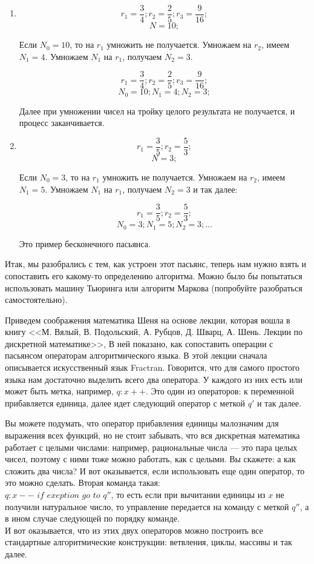 \documentclass[russian]{lecture-notes}
\begin{document}
	\begin{example*}
		\begin{enumerate}
			\item 
			$$r_1 = \frac{3}{4}; r_2 = \frac{2}{5}; r_3 = \frac{9}{16};$$
			$$N = 10;$$
			
			Если $N_0 = 10$, то на $r_1$ умножить не получается. Умножаем на $r_2$, имеем $N_1 = 4$. Умножаем $N_1$ на $r_1$, получаем $N_2 = 3$.
			
			$$r_1 = \frac{3}{4}; r_2 = \frac{2}{5}; r_3 = \frac{9}{16};$$
			$$N_0 = 10; N_1 = 4; N_2 = 3;$$
			
			Далее при умножении чисел на тройку целого результата не получается, и процесс заканчивается.  
			
			\item 
			$$r_1 = \frac{3}{5}; r_2 = \frac{5}{3};$$
			$$N = 3;$$
			
			Если $N_0 = 3$, то на $r_1$ умножить не получается. Умножаем на $r_2$, имеем $N_1 = 5$. Умножаем $N_1$ на $r_1$, получаем $N_2 = 3$ и так далее:
			
			$$r_1 = \frac{3}{5}; r_2 = \frac{5}{3};$$
			$$N_0 = 3; N_1 = 5; N_2 = 3; \ldots$$
			
			Это пример бесконечного пасьянса.
		\end{enumerate}
	\end{example*}
	
	Итак, мы разобрались с тем, как устроен этот пасьянс, теперь нам нужно взять и сопоставить его какому-то определению алгоритма. Можно было бы попытаться использовать машину Тьюринга или алгоритм Маркова (попробуйте разобраться самостоятельно). 
	
	Приведем соображения математика Шеня на основе лекции, которая вошла в книгу <<М. Вялый, В. Подольский, А. Рубцов, Д. Шварц, А. Шень. Лекции по дискретной математике>>, В ней показано, как сопоставить операции с пасьянсом операторам алгоритмического языка. В этой лекции сначала описывается искусственный язык Fractran. Говорится, что для самого простого языка нам достаточно выделить всего два оператора. У каждого из них есть или может быть метка, например, $q: x + +$. Это один из операторов: к переменной прибавляется единица, далее идет следующий оператор с меткой $q'$ и так далее.
	
	Вы можете подумать, что оператор прибавления единицы малозначим для выражения всех функций, но не стоит забывать, что вся дискретная математика работает с целыми числами: например, рациональные числа --- это пара целых чисел, поэтому с ними тоже можно работать, как с целыми. Вы скажете: а как сложить два числа? И вот оказывается, если использовать еще один оператор, то это можно сделать. Вторая команда такая:\\ $q: x - -$ $if$ $exeption$ $go$ $to$ $q''$, то есть если при вычитании единицы из $x$ не получили натуральное число, то управление передается на команду с меткой $q''$, а в ином случае следующей по порядку команде. \\
	И вот оказывается, что из этих двух операторов можно построить все стандартные алгоритмические конструкции: ветвления, циклы, массивы и так далее. 
	
\end{document}
